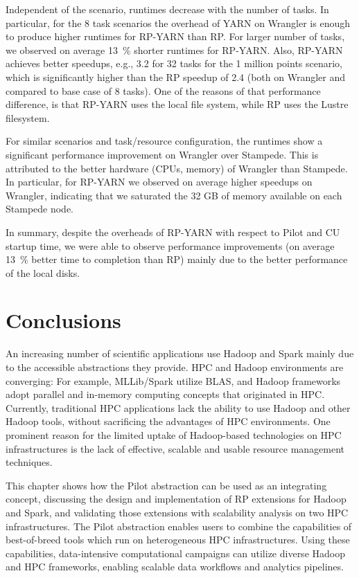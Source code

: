 Independent of the scenario, runtimes decrease with the number of tasks. In
particular, for the 8 task scenarios the overhead of YARN on Wrangler is
enough to produce higher runtimes for RP-YARN than RP. For larger number of
tasks, we observed on average 13~\% shorter runtimes for RP-YARN.
Also, RP-YARN achieves better speedups, e.g., 3.2 for 32 tasks for
the 1 million points scenario, which is significantly higher than the
RP speedup of 2.4 (both on Wrangler and compared to base case of 8
tasks). One of the reasons of that performance difference, is that
RP-YARN uses the local file system, while RP uses the
Lustre filesystem.

For similar scenarios and task/resource configuration, the runtimes show a
significant performance improvement on Wrangler over Stampede. This is
attributed to the better hardware (CPUs, memory) of Wrangler than Stampede. In
particular, for RP-YARN we observed on average higher speedups on
Wrangler, indicating that we saturated the 32 GB of memory available on each
Stampede node.

In summary, despite the overheads of RP-YARN with respect to Pilot
and CU startup time, we were able to observe performance improvements
(on average 13~\% better time to completion than RP) mainly due to
the better performance of the local disks.


\section{Conclusions}
\label{sec:hpc_hadoop_concl}

An increasing number of scientific applications use Hadoop and Spark mainly due
to the accessible abstractions they provide. HPC and Hadoop environments are
converging: For example, MLLib/Spark utilize BLAS, and Hadoop frameworks adopt
parallel and in-memory computing concepts that originated in HPC. Currently,
traditional HPC applications lack the ability to use Hadoop and other Hadoop
tools, without sacrificing the advantages of HPC environments. One prominent
reason for the limited uptake of Hadoop-based technologies on HPC
infrastructures is the lack of effective, scalable and usable resource
management techniques.

This chapter shows how the Pilot abstraction can be used as an integrating
concept, discussing the design and implementation of RP extensions
for Hadoop and Spark, and validating those extensions with scalability analysis
on two HPC infrastructures. The Pilot abstraction enables users to combine the
capabilities of best-of-breed tools which run on heterogeneous HPC
infrastructures. Using these capabilities, data-intensive computational
campaigns can utilize diverse Hadoop and HPC frameworks, enabling
scalable data workflows and analytics pipelines.

